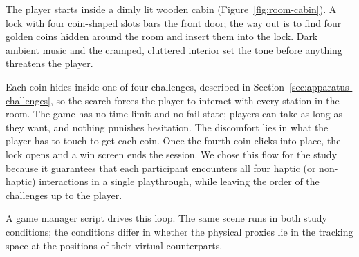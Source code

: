 The player starts inside a dimly lit wooden cabin (Figure~\ref{fig:room-cabin}). A lock with four coin-shaped slots bars the front door; the way out is to find four golden coins hidden around the room and insert them into the lock. Dark ambient music and the cramped, cluttered interior set the tone before anything threatens the player.

Each coin hides inside one of four challenges, described in Section~\ref{sec:apparatus-challenges}, so the search forces the player to interact with every station in the room. The game has no time limit and no fail state; players can take as long as they want, and nothing punishes hesitation. The discomfort lies in what the player has to touch to get each coin. Once the fourth coin clicks into place, the lock opens and a win screen ends the session. We chose this flow for the study because it guarantees that each participant encounters all four haptic (or non-haptic) interactions in a single playthrough, while leaving the order of the challenges up to the player.

A game manager script drives this loop. The same scene runs in both study conditions; the conditions differ in whether the physical proxies lie in the tracking space at the positions of their virtual counterparts.




